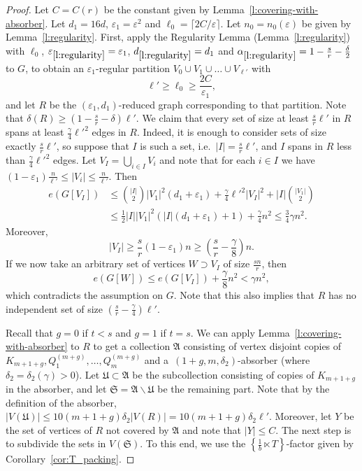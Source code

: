 \documentclass[reqno, 12pt]{amsart}
\numberwithin{equation}{section}
\numberwithin{figure}{section}
\theoremstyle{plain}
\theoremstyle{definition}
\let\eps=\varepsilon
\def\fA{\mathfrak{A}}
\def\fS{\mathfrak{S}}
\def\fU{\mathfrak{U}}
\let\setminus=\smallsetminus
\begin{document}
    \begin{proof}
        Let $C=C(r)$ be the constant given by Lemma~\ref{l:covering-with-absorber}. 
        Let $d_1 = 16d$, $\eps_1=\eps^2$ and $\ell_0=\lceil 2C/\eps\rceil$. Let $n_0=n_0(\eps)$ %
        be given by Lemma~\ref{l:regularity}.
        First, apply the Regularity Lemma (Lemma~\ref{l:regularity}) with $\ell_0$,  $\eps_{\ref{l:regularity}}=\eps_1$, $d_{\ref{l:regularity}}=d_1$ and $\alpha_{\ref{l:regularity}}=1-\frac{s}{r}-\frac{\delta}2$ to $G$, to obtain an $\eps_1$-regular partition $V_0 \cup V_1 \cup \dots \cup V_{\ell'}$ with \begin{equation}\label{eq:ell'}
            \ell' \geq \ell_0 \geq \frac{2C}{\eps_1},
        \end{equation} and let $R$ be the $(\eps_1,d_1)$-reduced graph corresponding to that partition. Note that $\delta(R) \geq \left(1-\frac{s}{r}-\delta\right)\ell'$. We claim that every set of size at least $\frac sr \ell'$ in $R$ spans at least $\frac \gamma 4 \ell'^2$ edges in $R$. Indeed, it is enough to consider sets of size exactly $\frac{s}{r}\ell'$, so suppose that $I$ is such a set, i.e.~$|I| = \frac sr \ell'$, and $I$ spans in $R$ less than $\frac \gamma 4\ell'^2$ edges. Let $V_I = \bigcup_{i\in I} V_i$ and note that for each $i\in I$ we have $(1-\eps_1)\frac n{\ell'}\leq|V_i|\leq\frac{n}{\ell'}$. Then
        \begin{align*} e(G[V_I]) & \leq {|I|\choose 2}|V_1|^2(d_1+\eps_1)+\frac{\gamma}{4}\ell'^2|V_I|^2 + |I|{|V_1|\choose 2} \\ &\leq \frac{1}{2}|I||V_1|^2\left(|I|(d_1+\eps_1)+1 \right)+\frac\gamma4 n^2 \leq \frac34\gamma n^2.
        \end{align*}
        Moreover,
          \[ |V_I| \geq \frac{s}{r} (1-\eps_1)n \geq \left(\frac{s}{r} - \frac{\gamma}8\right)n.\]
          If we now take an arbitrary set of vertices $W \supset V_I$ of size $\frac{sn}{r}$, then 
          \[ e(G[W]) \leq e(G[V_I]) + \frac{\gamma}8n^2 < \gamma n^2,\]
          which contradicts the assumption on $G$.
          Note that this also implies that $R$ has no independent set of size $\left(\frac sr-\frac \gamma4\right)\ell'$.

          Recall that $g = 0$ if $t<s$ and $g=1$ if $t=s$. We can apply Lemma~\ref{l:covering-with-absorber} to $R$ to get a collection $\fA$ consisting of vertex disjoint copies of $K_{m+1+g}, Q_1^{(m+g)}, \ldots, Q_m^{(m+g)}$ and a~$(1+g, m, \delta_2)$-absorber (where $\delta_2 = \delta_2(\gamma) >0$). Let $\fU\subset \fA$ be the subcollection consisting of copies of $K_{m+1+g}$ in the absorber, and let $\fS = \fA \setminus \fU$ be the remaining part. Note that by the definition of the absorber, $|V(\fU)|\leq 10(m+1+g)\delta_2|V(R)|=10(m+1+g)\delta_2\ell'$. Moreover, let $Y$ be the set of vertices of $R$ not covered by $\fA$ and note that $|Y|\leq C$. The next step is to subdivide the sets in $V(\fS)$. To this end, we use the $\left\{\frac 1b\ltimes T\right\}$-factor given by Corollary~\ref{cor:T_packing}.


\end{proof}
\end{document}
